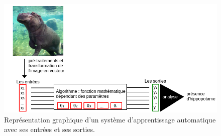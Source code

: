 \begin{figure}
  \centering
  \includegraphics[width=16cm]{./Chapitre2/figures/apprentissageE_S.png}
  \caption{Représentation graphique d'un système d'apprentissage automatique avec ses entrées et ses sorties.}
  \label{fig:apprentissageE_S}
\end{figure}
